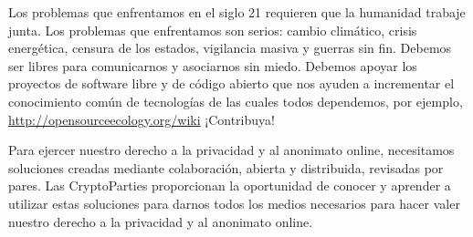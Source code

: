 \documentclass[10pt,a5paper,twoside,,]{book}
\begin{document}
Los problemas que enfrentamos en el siglo 21 requieren que la humanidad
trabaje junta. Los problemas que enfrentamos son serios: cambio
climático, crisis energética, censura de los estados, vigilancia masiva
y guerras sin fin. Debemos ser libres para comunicarnos y asociarnos sin
miedo. Debemos apoyar los proyectos de software libre y de código
abierto que nos ayuden a incrementar el conocimiento común de
tecnologías de las cuales todos dependemos, por ejemplo,
\url{http://opensourceecology.org/wiki} ¡Contribuya!

Para ejercer nuestro derecho a la privacidad y al anonimato online,
necesitamos soluciones creadas mediante colaboración, abierta y
distribuida, revisadas por pares. Las CryptoParties proporcionan la
oportunidad de conocer y aprender a utilizar estas soluciones para
darnos todos los medios necesarios para hacer valer nuestro derecho a la
privacidad y al anonimato online.
\end{document}
